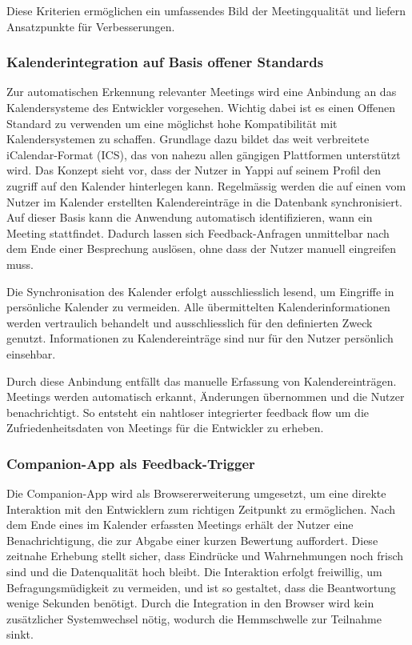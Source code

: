 \documentclass[12pt,a4paper]{report}
\begin{document}
Diese Kriterien ermöglichen ein umfassendes Bild der Meetingqualität und liefern Ansatzpunkte für Verbesserungen.

\subsubsection{Kalenderintegration auf Basis offener Standards}

Zur automatischen Erkennung relevanter Meetings wird eine Anbindung an das Kalendersysteme des Entwickler vorgesehen.
Wichtig dabei ist es einen Offenen Standard zu verwenden um eine möglichst hohe Kompatibilität mit Kalendersystemen zu schaffen.
Grundlage dazu bildet das weit verbreitete iCalendar-Format (ICS), das von nahezu allen gängigen Plattformen unterstützt wird.
Das Konzept sieht vor, dass der Nutzer in Yappi auf seinem Profil den zugriff auf den Kalender hinterlegen kann.
Regelmässig werden die auf einen vom Nutzer im Kalender erstellten Kalendereinträge in die Datenbank synchronisiert.
Auf dieser Basis kann die Anwendung automatisch identifizieren, wann ein Meeting stattfindet.
Dadurch lassen sich Feedback-Anfragen unmittelbar nach dem Ende einer Besprechung auslösen, ohne dass der Nutzer manuell eingreifen muss.

Die Synchronisation des Kalender erfolgt ausschliesslich lesend, um Eingriffe in persönliche Kalender zu vermeiden.
Alle übermittelten Kalenderinformationen werden vertraulich behandelt und ausschliesslich für den definierten Zweck genutzt.
Informationen zu Kalendereinträge sind nur für den Nutzer persönlich einsehbar.

Durch diese Anbindung entfällt das manuelle Erfassung von Kalendereinträgen. Meetings werden automatisch erkannt,
Änderungen übernommen und die Nutzer benachrichtigt. So entsteht ein nahtloser integrierter feedback flow um die
Zufriedenheitsdaten von Meetings für die Entwickler zu erheben.

\subsubsection{Companion-App als Feedback-Trigger}

Die Companion-App wird als Browsererweiterung umgesetzt, um eine direkte Interaktion mit den Entwicklern zum richtigen
Zeitpunkt zu ermöglichen. Nach dem Ende eines im Kalender erfassten Meetings erhält der Nutzer eine Benachrichtigung,
die zur Abgabe einer kurzen Bewertung auffordert. Diese zeitnahe Erhebung stellt sicher, dass Eindrücke und Wahrnehmungen
noch frisch sind und die Datenqualität hoch bleibt. Die Interaktion erfolgt freiwillig, um Befragungsmüdigkeit zu vermeiden,
und ist so gestaltet, dass die Beantwortung wenige Sekunden benötigt. Durch die Integration in den Browser wird kein
zusätzlicher Systemwechsel nötig, wodurch die Hemmschwelle zur Teilnahme sinkt.
\end{document}

